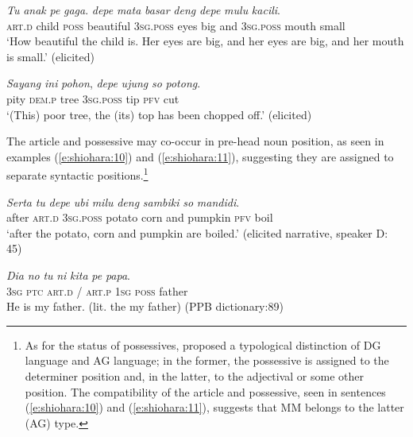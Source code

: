\documentclass[output=paper
,modfonts
,nonflat]{langsci/langscibook}
\begin{document}
\begin{exe}
	\ex\label{e:shiohara:8}
	\gll \textit{Tu}  \textit{anak}  \textit{pe}  \textit{gaga}. \textit{depe}    \textit{mata}  \textit{basar}  \textit{deng}  \textit{depe}    \textit{mulu}  \textit{kacili}.\\
	\textsc{art.d}  child  \textsc{poss}  beautiful \textsc{3sg.poss}  eyes  big  and  3\textsc{sg.poss}  mouth  small\\
	\glt ‘How beautiful the child is. Her eyes are big, and her eyes are big, and her mouth is small.’ \hfill{(elicited)}
\end{exe}

\begin{exe}
	\ex\label{e:shiohara:9}
	\gll \textit{Sayang}  \textit{ini}  \textit{pohon},  \textit{depe}    \textit{ujung}  \textit{so}  \textit{potong}.\\
	pity  \textsc{dem.p}  tree  3\textsc{sg.poss}  tip  \textsc{pfv}  cut\\
	\glt ‘(This) poor tree, the (its) top has been chopped off.’ \hfill{(elicited)}
\end{exe}

\noindent
The article and possessive may co-occur in pre-head noun position, as seen in examples (\ref{e:shiohara:10}) and (\ref{e:shiohara:11}), suggesting they are assigned to separate syntactic positions.\footnote{As for the status of possessives, \citet[130--134]{Lyons1999} proposed a typological distinction of DG language and AG language; in the former, the possessive is assigned to the determiner position and, in the latter, to the adjectival or some other position. The compatibility of the article and possessive, seen in sentences (\ref{e:shiohara:10}) and (\ref{e:shiohara:11}), suggests that MM belongs to the latter (AG) type.}

\begin{exe}
	\ex\label{e:shiohara:10}
	\gll \textit{Serta} \textit{tu} \textit{depe} \textit{ubi} \textit{milu} \textit{deng} \textit{sambiki} \textit{so} \textit{mandidi}.\\
	after  \textsc{art.d 3sg.poss} potato  corn  and  pumpkin \textsc{pfv}  boil\\
	\glt ‘after the potato, corn and pumpkin are boiled.’ {(elicited narrative, speaker D: 45)}
\end{exe}

\begin{exe}
	\ex\label{e:shiohara:11}
	\gll \textit{Dia} \textit{no} \textit{tu} {\USSlash} \textit{ni} \textit{kita} \textit{pe} \textit{papa}.\\
	\textsc{3sg}  \textsc{ptc}  \textsc{art.d} / \textsc{art.p}  \textsc{1sg}  \textsc{poss}  father\\
	\glt He is my father. (lit. the my father) \hfill{(PPB dictionary:89)}
\end{exe}
\end{document}
